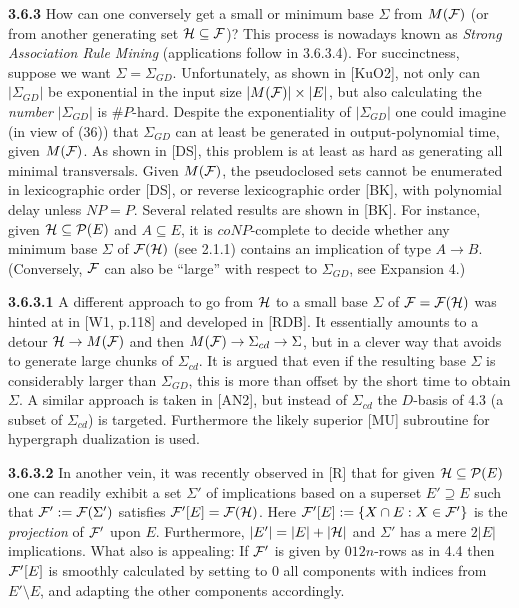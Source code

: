 \documentclass[11pt]{article}
\newcommand{\ra}{\rightarrow}
\begin{document}
{\bf 3.6.3} How can one conversely get a small or minimum base $\Sigma$ from $M({\cal F})$ (or from another generating set ${\cal H} \subseteq {\cal F}$)?
 This process is nowadays known as {\it Strong Association Rule Mining} (applications follow in 3.6.3.4). For succinctness, suppose we want $\Sigma = \Sigma_{GD}$. Unfortunately, as shown in [KuO2], not only can $|\Sigma_{GD}|$ be exponential in the input size $|M({\cal F})|\times |E|$, but also calculating the {\it number} $|\Sigma_{GD}| $ is \#$P$-hard.  Despite the exponentiality of $|\Sigma_{GD}|$ one could imagine (in view of (36)) that $\Sigma_{GD}$ can at least be generated in output-polynomial time, given $M({\cal F})$. As shown in [DS], this problem is at least as hard as generating all minimal transversals. Given $M({\cal F})$, the pseudoclosed sets cannot be enumerated in lexicographic order [DS], or reverse lexicographic order [BK], with polynomial delay unless $NP = P$. Several related results are shown in [BK]. For instance, given ${\cal H} \subseteq {\cal P}(E)$ and $A \subseteq E$, it is $coNP$-complete to decide whether any minimum base $\Sigma$ of ${\cal F}({\cal H})$ (see 2.1.1) contains an implication of type $A \ra B$. (Conversely, ${\cal F}$ can also be ``large'' with respect to $\Sigma_{GD}$, see Expansion 4.)
 
{\bf 3.6.3.1}  A different approach to go from ${\cal H}$ to a small base $\Sigma$ of ${\cal F} = {\cal F}({\cal H})$  was hinted at in [W1, p.118] and developed in [RDB]. It essentially amounts to a detour ${\cal H} \ra M({\cal F})$ and then $M({\cal F}) \ra \Sigma_{cd} \ra \Sigma$, but in a clever way that avoids to generate large chunks of $\Sigma_{cd}$. It is argued that even if the resulting base $\Sigma$ is considerably larger than $\Sigma_{GD}$, this is more than offset by the short time to obtain $\Sigma$. A similar approach is taken in [AN2], but instead of $\Sigma_{cd}$ the $D$-basis of 4.3 (a subset of $\Sigma_{cd}$) is targeted. Furthermore the likely superior [MU] subroutine for hypergraph dualization is used.

{\bf 3.6.3.2} In another vein, it was recently observed in [R] that for given ${\cal H} \subseteq {\cal P}(E)$ one can readily exhibit a set $\Sigma'$ of implications based on a superset $E'\supseteq E$ such that ${\cal F}': = {\cal F} (\Sigma')$ satisfies ${\cal F}'[E] = {\cal F}({\cal H})$. Here ${\cal F}'[E] : = \{X \cap E: X \in {\cal F}'\}$ is the {\it projection} of ${\cal F}'$ upon $E$. Furthermore, $|E'| = |E| + |{\cal H}|$ and $\Sigma'$ has a mere $2|E|$ implications. What also is appealing: If ${\cal F}'$ is given by $012n$-rows as in 4.4 then ${\cal F}'[E]$ is smoothly calculated by setting to $0$ all components with indices from $E'\setminus E$, and adapting the other components accordingly.
\end{document}
